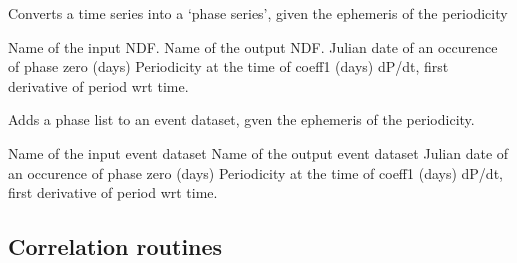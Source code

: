 
\begin{manroutinedescription}

Converts a time series into a `phase series', given the ephemeris of
the periodicity

\begin{manparametertable}
   Name of the input NDF.
   Name of the output NDF.
   Julian date of an occurence of phase zero (days)
   Periodicity at the time of coeff1 (days)
   dP/dt, first derivative of period wrt time.
\end{manparametertable}

\end{manroutinedescription}


\begin{manroutinedescription}

Adds a phase list to an event dataset, gven the ephemeris of
the periodicity.

\begin{manparametertable}
   Name of the input event dataset
   Name of the output event dataset
   Julian date of an occurence of phase zero (days)
   Periodicity at the time of coeff1 (days)
   dP/dt, first derivative of period wrt time.
\end{manparametertable}

\end{manroutinedescription}

\newpage

\subsection{Correlation routines}

